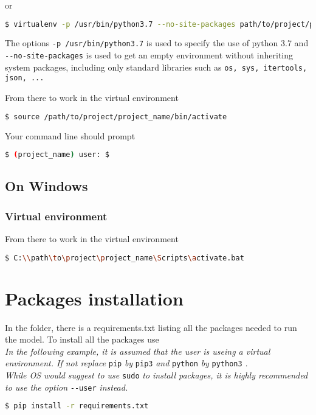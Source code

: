 or

\begin{lstlisting}[language=bash]
  $ virtualenv -p /usr/bin/python3.7 --no-site-packages path/to/project/project_name
\end{lstlisting}

The options \lstinline{-p /usr/bin/python3.7} is used to specify the use of python 3.7 and \lstinline{--no-site-packages} is used to get an empty environment without inheriting system packages, including only standard libraries such as \lstinline{os, sys, itertools, json, ...}

From there to work in the virtual environment

\begin{lstlisting}[language=bash]
  $ source /path/to/project/project_name/bin/activate
\end{lstlisting}

Your command line should prompt

\begin{lstlisting}[language=bash]
  $ (project_name) user: $
\end{lstlisting}

\subsection{On Windows}
\subsubsection{Virtual environment}

From there to work in the virtual environment

\begin{lstlisting}[language=bash]
  $ C:\\path\to\project\project_name\Scripts\activate.bat
\end{lstlisting}

\section{Packages installation} %
\label{sec:packages_installation}

In the folder, there is a requirements.txt listing all the packages needed to run the model. To install all the packages use\\

\textit{In the following example, it is assumed that the user is useing a virtual environment.
If not replace} \lstinline{pip} \textit{by} \lstinline{pip3} \textit{and} \lstinline{python} \textit{by} \lstinline{python3} \textit{.}\\
\textit{While OS would suggest to use} \lstinline{sudo} \textit{to install packages, it is highly recommended to use the option} \lstinline{--user} \textit{instead.}

\begin{lstlisting}[language=bash]
  $ pip install -r requirements.txt
\end{lstlisting}

